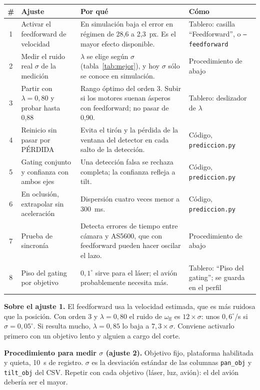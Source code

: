 \documentclass[11pt,a4paper]{article}
\newcommand{\cod}[1]{\texttt{#1}}
\newcommand{\lam}{\lambda}
\newcommand{\gr}{^{\circ}}
\begin{document}
\begin{table}[H]
\small
\renewcommand{\arraystretch}{1.25}
\begin{tabularx}{\linewidth}{@{}c>{\raggedright\arraybackslash}p{3.5cm}>{\raggedright\arraybackslash}X>{\raggedright\arraybackslash}p{3.6cm}@{}}
\toprule
\# & Ajuste & Por qué & Cómo \\
\midrule
1 & Activar el feedforward de velocidad & En simulación baja el error en régimen de 28,6 a 2,3~px. Es el mayor efecto disponible. & Tablero: casilla ``Feedforward'', o \cod{--feedforward} \\
2 & Medir el ruido real $\sigma$ de la medición & $\lam$ se elige según $\sigma$ (tabla~\ref{tab:mejor}), y hoy $\sigma$ sólo se conoce en simulación. & Procedimiento de abajo \\
3 & Partir con $\lam = 0{,}80$ y probar hasta 0,88 & Rango óptimo del orden 3. Subir si los motores suenan ásperos con feedforward; no pasar de 0,90. & Tablero: deslizador de $\lam$ \\
4 & Reinicio sin pasar por PÉRDIDA & Evita el tirón y la pérdida de la ventana del detector en cada salto de la detección. & Código, \cod{prediccion.py} \\
5 & Gating conjunto y confianza con ambos ejes & Una detección falsa se rechaza completa; la confianza refleja a tilt. & Código, \cod{prediccion.py} \\
6 & En oclusión, extrapolar sin aceleración & Dispersión cuatro veces menor a 300~ms. & Código, \cod{prediccion.py} \\
7 & Prueba de sincronía & Detecta errores de tiempo entre cámara y AS5600, que con feedforward pueden hacer oscilar el lazo. & Procedimiento de abajo \\
8 & Piso del gating por objetivo & $0{,}1\gr$ sirve para el láser; el avión probablemente necesita más. & Tablero: ``Piso del gating''; se guarda en el perfil \\
\bottomrule
\end{tabularx}
\end{table}

\textbf{Sobre el ajuste 1.} El feedforward usa la velocidad estimada, que es más ruidosa que la posición. Con
orden 3 y $\lam = 0{,}80$ el ruido de $\omega_{\mathrm{ff}}$ es $12 \times \sigma$: unos $0{,}6\gr$/s si
$\sigma = 0{,}05\gr$. Si resulta mucho, $\lam = 0{,}85$ lo baja a $7{,}3 \times \sigma$. Conviene activarlo
primero con un objetivo lento y alguien a cargo del corte.

\textbf{Procedimiento para medir $\sigma$ (ajuste 2).} Objetivo fijo, plataforma habilitada y quieta, 10~s de
registro. $\sigma$ es la desviación estándar de las columnas \cod{pan\_obj} y \cod{tilt\_obj} del CSV. Repetir
con cada objetivo (láser, luz, avión): el del avión debería ser el mayor.
\end{document}
